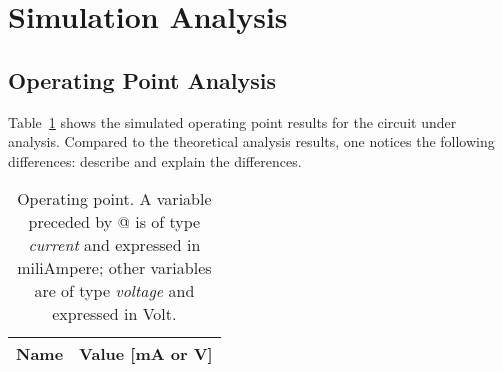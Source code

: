 \section{Simulation Analysis}
\label{sec:simulation}

\subsection{Operating Point Analysis}

Table~\ref{tab:op} shows the simulated operating point results for the circuit
under analysis. Compared to the theoretical analysis results, one notices the
following differences: describe and explain the differences.

\begin{table}[h]
  \centering
  \begin{tabular}{|l|r|}
    \hline    
    {\bf Name} & {\bf Value [mA or V]} \\ \hline
    
  \end{tabular}
  \caption{Operating point. A variable preceded by @ is of type {\em current}
    and expressed in miliAmpere; other variables are of type {\it voltage} and expressed in
    Volt.}
  \label{tab:op}
\end{table}



%
%



%
%
%


